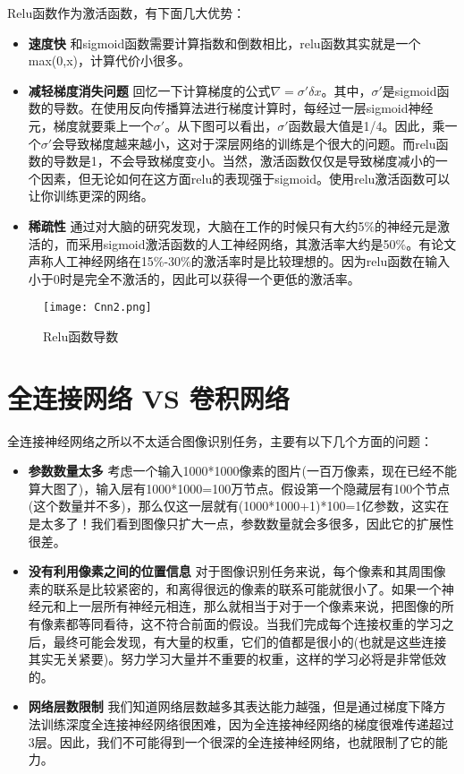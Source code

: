 Relu函数作为激活函数，有下面几大优势：

\begin{itemize}
	\item
	      \textbf{速度快}
	      和sigmoid函数需要计算指数和倒数相比，relu函数其实就是一个max(0,x)，计算代价小很多。
	\item
	      \textbf{减轻梯度消失问题}
	      回忆一下计算梯度的公式\(\nabla=\sigma'\delta x\)。其中，\(\sigma'\)是sigmoid函数的导数。在使用反向传播算法进行梯度计算时，每经过一层sigmoid神经元，梯度就要乘上一个\(\sigma'\)。从下图可以看出，\(\sigma'\)函数最大值是1/4。因此，乘一个\(\sigma'\)会导致梯度越来越小，这对于深层网络的训练是个很大的问题。而relu函数的导数是1，不会导致梯度变小。当然，激活函数仅仅是导致梯度减小的一个因素，但无论如何在这方面relu的表现强于sigmoid。使用relu激活函数可以让你训练更深的网络。
	\item
	      \textbf{稀疏性}
	      通过对大脑的研究发现，大脑在工作的时候只有大约5\%的神经元是激活的，而采用sigmoid激活函数的人工神经网络，其激活率大约是50\%。有论文声称人工神经网络在15\%-30\%的激活率时是比较理想的。因为relu函数在输入小于0时是完全不激活的，因此可以获得一个更低的激活率。
\end{itemize}

\begin{figure}[htbp]
	\centering
	\texttt{[image: Cnn2.png]}
	\caption{Relu函数导数}
	\label{fig:Cnn2}
\end{figure}



\section{全连接网络 VS 卷积网络}\label{Cnn:2}


全连接神经网络之所以不太适合图像识别任务，主要有以下几个方面的问题：

\begin{itemize}
	\item
	      \textbf{参数数量太多}
	      考虑一个输入1000*1000像素的图片(一百万像素，现在已经不能算大图了)，输入层有1000*1000=100万节点。假设第一个隐藏层有100个节点(这个数量并不多)，那么仅这一层就有(1000*1000+1)*100=1亿参数，这实在是太多了！我们看到图像只扩大一点，参数数量就会多很多，因此它的扩展性很差。
	\item
	      \textbf{没有利用像素之间的位置信息}
	      对于图像识别任务来说，每个像素和其周围像素的联系是比较紧密的，和离得很远的像素的联系可能就很小了。如果一个神经元和上一层所有神经元相连，那么就相当于对于一个像素来说，把图像的所有像素都等同看待，这不符合前面的假设。当我们完成每个连接权重的学习之后，最终可能会发现，有大量的权重，它们的值都是很小的(也就是这些连接其实无关紧要)。努力学习大量并不重要的权重，这样的学习必将是非常低效的。
	\item
	      \textbf{网络层数限制}
	      我们知道网络层数越多其表达能力越强，但是通过梯度下降方法训练深度全连接神经网络很困难，因为全连接神经网络的梯度很难传递超过3层。因此，我们不可能得到一个很深的全连接神经网络，也就限制了它的能力。
\end{itemize}

